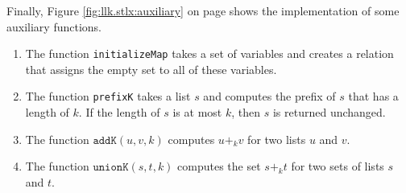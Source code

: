 \noindent
Finally, Figure \ref{fig:llk.stlx:auxiliary} on page \pageref{fig:llk.stlx:auxiliary} shows the
implementation of some auxiliary functions. 
\begin{enumerate}
\item The function \texttt{initializeMap} takes a set of variables and creates a relation that
      assigns the empty set to all of these variables.
\item The function \texttt{prefixK} takes a list $s$ and computes the prefix of $s$
      that has a length of $k$.  If the length of $s$ is at most $k$, then $s$ is returned
      unchanged. 
\item The function $\texttt{addK}(u,v,k)$ computes $u +_k v$ for two lists $u$ and $v$.
\item The function $\texttt{unionK}(s, t, k)$ computes the set $s +_k t$ for two sets of 
      lists $s$ and $t$.
\end{enumerate}

